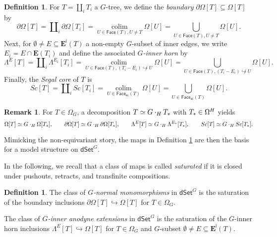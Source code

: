 \documentclass[a4paper,10pt
,draft
]{article}%
\numberwithin{equation}{section}
\numberwithin{figure}{section}
\theoremstyle{definition} %
\newtheorem{definition}[equation]{Definition}%
\newtheorem{remark}[equation]{Remark}%
\newcommand{\into}{\hookrightarrow}%
\newcommand{\dSet}{\mathsf{dSet}}
\DeclareMathOperator{\colim}{colim}%
\newcommand{\1}{\ensuremath{\mathbbm 1}}%
\begin{document}
\begin{definition}\label{DSETPRESHEAF_DEF}
	For $T = \amalg_i T_i$ a $G$-tree,
	we define the \emph{boundary}
	$\partial \Omega[T] \subseteq \Omega[T]$ by
\begin{equation}
	\partial \Omega[T] = 
	\amalg_i \partial \Omega[T_i]
	= \mathop{\colim}\limits_{U \in \mathsf{Face}(T), U \neq T} \Omega[U]
	= \bigcup_{U \in \mathsf{Face}(T), U \neq T} \Omega[U].
\end{equation}
	Next, for $\emptyset \neq E \subseteq \boldsymbol{E}^{\mathsf{i}}(T)$ a non-empty $G$-subset of inner edges, we write $E_i = E \cap \boldsymbol{E}(T_i)$
	and define the associated \textit{$G$-inner horn} by
\begin{equation}\label{GINNERHORN_EQ}
	\Lambda^{E}[T] = \amalg_i \Lambda^{E_i}[T_i]
	= \mathop{\colim}\limits_{U \in \mathsf{Face}(T), (T_i - E_i) \not\into U} \Omega[U]
	= \bigcup_{U \in \mathsf{Face}(T), (T_i - E_i) \not\into U} \Omega[U].
\end{equation}
	Finally, the \textit{Segal core} of $T$ is
\begin{equation}\label{eq:SC}
	Sc[T] = 
	\amalg_i Sc[T_i] =
	\mathop{\colim}\limits_{U \in \mathsf{Face}_{\mathsf{sc}}(T)} \Omega[U] =
	\bigcup_{U \in \mathsf{Face}_{\mathsf{sc}}(T)} \Omega[U].
\end{equation}
\end{definition}


\begin{remark}
For $T \in \Omega_G$, a decomposition $T \simeq G \cdot_H T_{\**}$ with $T_{\**} \in \Omega^H$ yields
\[
	\Omega[T] \simeq G \cdot_H \Omega[T_{\**}],
\qquad
	\partial\Omega[T] \simeq G \cdot_H \partial \Omega[T_{\**}],
\qquad
	\Lambda^{E}[T] \simeq G \cdot_H \Lambda^{E_{\**}}[T_{\**}],
\qquad
	Sc[T] \simeq G \cdot_H Sc[T_{\**}].
\]
\end{remark}


Mimicking the non-equivariant story, the maps in Definition \ref{DSETPRESHEAF_DEF} are then the basis for a model structure on $\dSet^G$.

In the following, we recall that a class of maps is called \textit{saturated} if it is closed under pushouts, retracts, and transfinite compositions.

\begin{definition}
	The class of \textit{$G$-normal monomorphisms}
	in $\mathsf{dSet}^G$
	is the saturation of the boundary inclusions 
	$\partial \Omega[T] \into \Omega[T]$ for $T \in \Omega_G$.
	
	The class of \textit{$G$-inner anodyne extensions}
	in $\mathsf{dSet}^G$
	is the saturation of the $G$-inner horn inclusions
	$\Lambda^E [T] \into \Omega[T]$ 
	for $T \in \Omega_G$ and $G$-subset
	$\emptyset \neq E \subseteq
	\boldsymbol{E}^{\mathsf{i}}(T).$
\end{definition}
\end{document}
